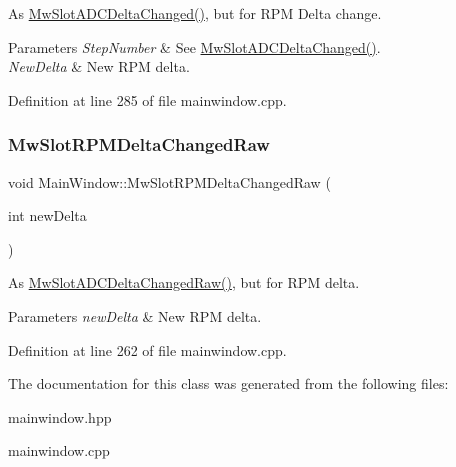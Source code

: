 As \hyperlink{class_main_window_a5778840f76f8ce6edd63d84b57b801b1}{Mw\+Slot\+A\+D\+C\+Delta\+Changed()}, but for R\+PM Delta change. 


\begin{DoxyParams}{Parameters}
{\em Step\+Number} & See \hyperlink{class_main_window_a5778840f76f8ce6edd63d84b57b801b1}{Mw\+Slot\+A\+D\+C\+Delta\+Changed()}. \\
\hline
{\em New\+Delta} & New R\+PM delta. \\
\hline
\end{DoxyParams}


Definition at line 285 of file mainwindow.\+cpp.

\mbox{\label{class_main_window_a4480e7516f91b93c8abc3d42c1284124}} 
\subsubsection{\texorpdfstring{Mw\+Slot\+R\+P\+M\+Delta\+Changed\+Raw}{MwSlotRPMDeltaChangedRaw}}
{\footnotesize\ttfamily void Main\+Window\+::\+Mw\+Slot\+R\+P\+M\+Delta\+Changed\+Raw (\begin{DoxyParamCaption}\item[{int}]{new\+Delta }\end{DoxyParamCaption})\hspace{0.3cm}{\ttfamily [slot]}}



As \hyperlink{class_main_window_acbdfd3592779f6946c4fecc33c79e9a4}{Mw\+Slot\+A\+D\+C\+Delta\+Changed\+Raw()}, but for R\+PM delta. 


\begin{DoxyParams}{Parameters}
{\em new\+Delta} & New R\+PM delta. \\
\hline
\end{DoxyParams}


Definition at line 262 of file mainwindow.\+cpp.



The documentation for this class was generated from the following files\+:\begin{DoxyCompactItemize}
\item 
mainwindow.\+hpp\item 
mainwindow.\+cpp\end{DoxyCompactItemize}
